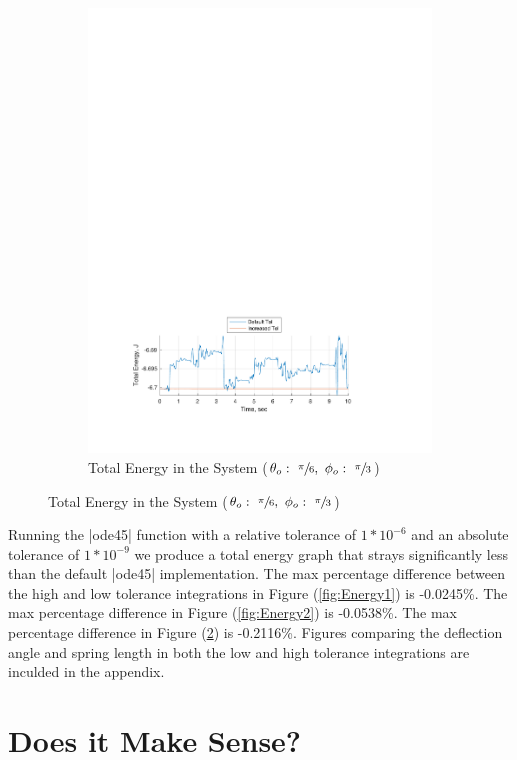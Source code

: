\documentclass[12pt]{report}
\begin{document}
\begin{flushleft}
\begin{figure}[!htp]
\begin{subfigure}[t]{\textwidth}
  \includegraphics[center,width=.9\textwidth]{Energy3}
  \caption{Total Energy in the System ($\theta_o:~\sfrac{\pi}{6},~\phi_o:~\sfrac{\pi}{3}$)}
  \label{fig:Energy3}
\end{subfigure}
\end{figure}

Running the |ode45| function with a relative tolerance of
$1*10^{-6}$ and an absolute
tolerance of $1*10^{-9}$ we produce a total energy graph that strays significantly
less than the default |ode45| implementation. The max percentage difference between
the high and low tolerance integrations in Figure (\ref{fig:Energy1}) is -0.0245\%.
The max percentage difference in Figure (\ref{fig:Energy2}) is
-0.0538\%. The max percentage difference in Figure (\ref{fig:Energy3}) is
-0.2116\%. Figures comparing the deflection angle and spring length in both the low and high tolerance integrations are inculded in the appendix.

\newpage
\section{Does it Make Sense?}


\end{flushleft}
\end{document}
